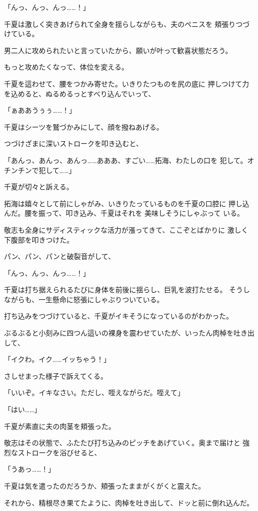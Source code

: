 ﻿\documentclass[
    book,tate,
    line_length=30zw,
    jafontsize=12pt,
    paper=b5j,
    landscape,
    ]{jlreq}
\begin{document}
「んっ、んっ、んっ……！」

千夏は激しく突きあげられて全身を揺らしながらも、夫のペニスを
頬張りつづけている。

男二人に攻められたいと言っていたから、願いが叶って歓喜状態だろう。

もっと攻めたくなって、体位を変える。

千夏を這わせて、腰をつかみ寄せた。いきりたつものを尻の底に
押しつけて力を込めると、ぬるめるっとすべり込んでいって、

「ぁああうぅぅ……！」

千夏はシーツを鷲づかみにして、顔を撥ねあげる。

つづけざまに深いストロークを叩き込むと、

「あんっ、あんっ、あんっ……あああ、すごい……拓海、わたしの口を
犯して。オチンチンで犯して……」

千夏が切々と訴える。

拓海は嬉々として前にしゃがみ、いきりたっているものを千夏の口腔に
押し込んだ。腰を振って、叩き込み、千夏はそれを 美味しそうにしゃぶって
いる。

敬志も全身にサディスティックな活力が漲ってきて、ここぞとばかりに
激しく下腹部を叩きつけた。

パン、パン、パンと破裂音がして、

「んっ、んっ、んっ……！」

千夏は打ち据えられるたびに身体を前後に揺らし、巨乳を波打たせる。
そうしながらも、一生懸命に怒張にしゃぶりついている。

打ち込みをつづけていると、千夏がイキそうになっているのがわかった。

ぶるぶると小刻みに四つん這いの裸身を震わせていたが、いったん肉棹を吐き出して、

「イクわ。イク……イッちゃう！」

さしせまった様子で訴えてくる。

「いいぞ。イキなさい。ただし、咥えながらだ。咥えて」

「はい……」

千夏が素直に夫の肉茎を頬張った。

敬志はその状態で、ふたたび打ち込みのピッチをあげていく。奥まで届けと
強烈なストロークを浴びせると、

「うあっ……！」

千夏は気を遣ったのだろうか、頬張ったままがくがくと震えた。

それから、精根尽き果てたように、肉棹を吐き出して、ドッと前に倒れ込んだ。

\section*{}
\end{document}
